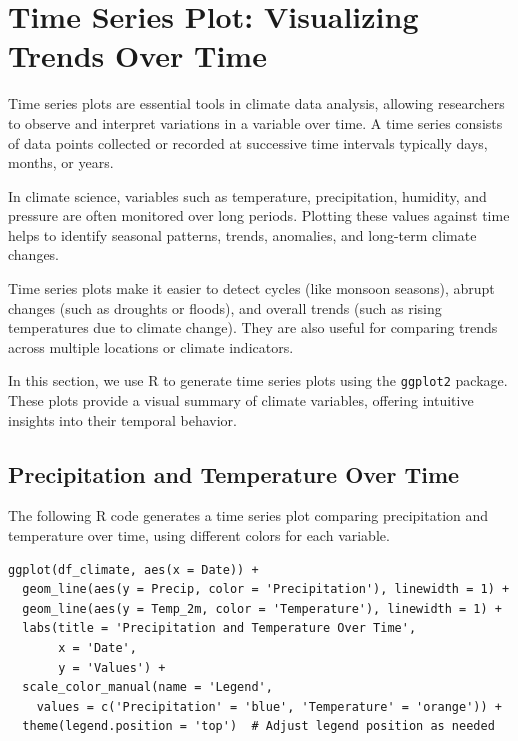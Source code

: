 \section{Time Series Plot: Visualizing Trends Over Time}

Time series plots are essential tools in climate data analysis, allowing researchers to observe and interpret variations in a variable over time. A time series consists of data points collected or recorded at successive time intervals typically days, months, or years.

In climate science, variables such as temperature, precipitation, humidity, and pressure are often monitored over long periods. Plotting these values against time helps to identify seasonal patterns, trends, anomalies, and long-term climate changes.

Time series plots make it easier to detect cycles (like monsoon seasons), abrupt changes (such as droughts or floods), and overall trends (such as rising temperatures due to climate change). They are also useful for comparing trends across multiple locations or climate indicators.

In this section, we use R to generate time series plots using the \texttt{ggplot2} package. These plots provide a visual summary of climate variables, offering intuitive insights into their temporal behavior.

\subsection*{Precipitation and Temperature Over Time}

The following R code generates a time series plot comparing precipitation and temperature over time, using different colors for each variable.

\begin{verbatim}
ggplot(df_climate, aes(x = Date)) +
  geom_line(aes(y = Precip, color = 'Precipitation'), linewidth = 1) +
  geom_line(aes(y = Temp_2m, color = 'Temperature'), linewidth = 1) +
  labs(title = 'Precipitation and Temperature Over Time',
       x = 'Date',
       y = 'Values') +
  scale_color_manual(name = 'Legend', 
    values = c('Precipitation' = 'blue', 'Temperature' = 'orange')) +
  theme(legend.position = 'top')  # Adjust legend position as needed
\end{verbatim}

